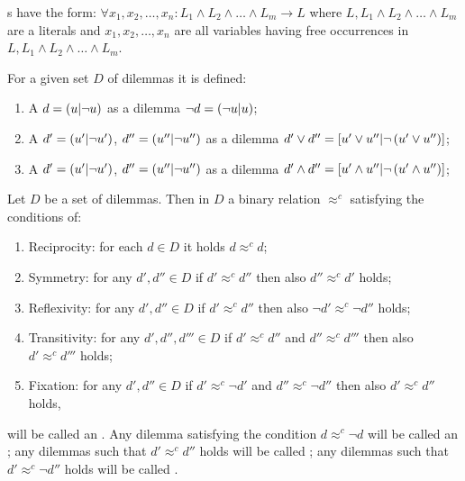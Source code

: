 \begin{defi}
s have the form: $\forall x_1,x_2,\ldots,x_n:L_1\wedge L_2\wedge\ldots\wedge L_m\rightarrow L$ where $L,L_1\wedge L_2\wedge\ldots\wedge L_m$ are a literals and $x_1,x_2,\ldots,x_n$ are all variables having free occurrences in $L,L_1\wedge L_2\wedge\ldots\wedge L_m$.
\cite{conf/fedcsis/Telnarova12}
\end{defi}

\begin{defi}
For a given set $D$ of dilemmas it is defined:
\begin{enumerate}
 \item A  $d=\left( u|\neg u\right)$ as a dilemma $\neg d=\left( \neg u|u\right)$;
 \item A  $d'=\left( u'|\neg u'\right)$, $d''=\left( u''|\neg u''\right)$ as a dilemma $d'\vee d''=\left[ u'\vee u''|\neg\left( u'\vee u''\right)\right]$;%
 \item A  $d'=\left( u'|\neg u'\right)$, $d''=\left( u''|\neg u''\right)$ as a dilemma $d'\wedge d''=\left[ u'\wedge u''|\neg\left( u'\wedge u''\right)\right]$;%
\end{enumerate}
\cite{conf/fedcsis/Kulikowski12}
\end{defi}

\begin{defi}
Let $D$ be a set of dilemmas. Then in $D$ a binary relation $\approx^c$ satisfying the conditions of:
\begin{enumerate}
\item Reciprocity: for each $d\in D$ it holds $d\approx^c d$;
\item Symmetry: for any $d',d''\in D$ if $d'\approx^c d''$ then also $d''\approx^c d'$ holds;
\item Reflexivity: for any $d',d''\in D$ if $d'\approx^c d''$ then also $\neg d'\approx^c\neg d''$ holds;
\item Transitivity: for any $d',d'',d'''\in D$ if $d'\approx^c d''$ and $d''\approx^c d'''$ then also $d'\approx^c d'''$ holds;
\item Fixation: for any $d',d''\in D$ if $d'\approx^c\neg d'$ and $d''\approx^c\neg d''$ then also $d'\approx^c d''$ holds,
\end{enumerate}
will be called an . Any dilemma satisfying the condition $d\approx^c\neg d$ will be called an ; any dilemmas such that $d'\approx^c d''$ holds will be called ; any dilemmas such that $d'\approx^c\neg d''$ holds will be called .
\cite{conf/fedcsis/Kulikowski12}
\end{defi}

